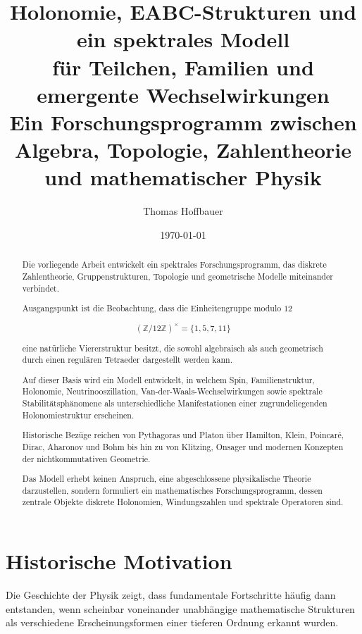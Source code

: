 \documentclass[11pt,a4paper]{article}
\title{
	Holonomie, EABC-Strukturen und ein spektrales Modell\\
	für Teilchen, Familien und emergente Wechselwirkungen\\[0.5em]
	\large Ein Forschungsprogramm zwischen Algebra,
	Topologie, Zahlentheorie und mathematischer Physik
}
\author{
	Thomas Hoffbauer
}
\date{\today}
\begin{document}
	
	\maketitle
	
	\begin{abstract}
		
		Die vorliegende Arbeit entwickelt ein spektrales Forschungsprogramm,
		das diskrete Zahlentheorie, Gruppenstrukturen,
		Topologie und geometrische Modelle miteinander verbindet.
		
		Ausgangspunkt ist die Beobachtung,
		dass die Einheitengruppe modulo $12$
		
		\[
		(\mathbb Z/12\mathbb Z)^\times
		=
		\{1,5,7,11\}
		\]
		
		eine natürliche Viererstruktur besitzt,
		die sowohl algebraisch als auch geometrisch
		durch einen regulären Tetraeder dargestellt werden kann.
		
		Auf dieser Basis wird ein Modell entwickelt,
		in welchem Spin, Familienstruktur,
		Holonomie, Neutrinooszillation,
		Van-der-Waals-Wechselwirkungen
		sowie spektrale Stabilitätsphänomene
		als unterschiedliche Manifestationen
		einer zugrundeliegenden Holonomiestruktur erscheinen.
		
		Historische Bezüge reichen von
		Pythagoras und Platon
		über Hamilton, Klein, Poincaré,
		Dirac, Aharonov und Bohm
		bis hin zu von Klitzing, Onsager
		und modernen Konzepten der
		nichtkommutativen Geometrie.
		
		Das Modell erhebt keinen Anspruch,
		eine abgeschlossene physikalische Theorie darzustellen,
		sondern formuliert ein mathematisches Forschungsprogramm,
		dessen zentrale Objekte
		diskrete Holonomien,
		Windungszahlen
		und spektrale Operatoren sind.
		
	\end{abstract}
	
	\tableofcontents
	
	\newpage
	
	\section{Historische Motivation}
	
	Die Geschichte der Physik zeigt,
	dass fundamentale Fortschritte häufig dann entstanden,
	wenn scheinbar voneinander unabhängige mathematische Strukturen
	als verschiedene Erscheinungsformen
	einer tieferen Ordnung erkannt wurden.
	
\end{document}
